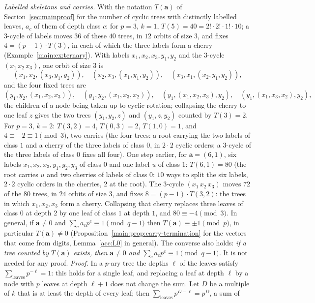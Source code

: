 \documentclass[11pt]{article}
\theoremstyle{definition}
\theoremstyle{remark}
\numberwithin{equation}{section}
\numberwithin{figure}{section}
\begin{document}
\emph{Labelled skeletons and carries.} With the notation $T(\mathbf a)$ of Section~\ref{sec:mainproof} for the
number of cyclic trees with distinctly labelled leaves, $a_c$ of them of depth class $c$: for $p=3$, $k=1$,
$T(5)=40=2!\cdot2!\cdot1!\cdot10$; a $3$-cycle of labels moves $36$ of these $40$ trees, in $12$ orbits of
size $3$, and fixes $4=(p-1)\cdot T(3)$, in each of which the three labels form a cherry
(Example~\ref{main:ex:ternary}).
With labels $x_1,x_2,x_3,y_1,y_2$ and the $3$-cycle $(x_1\,x_2\,x_3)$, one orbit of size $3$ is
\[
 (x_1,x_2,(x_3,y_1,y_2)),\quad(x_2,x_3,(x_1,y_1,y_2)),\quad(x_3,x_1,(x_2,y_1,y_2)),
\]
and the four fixed trees are
\[
 (y_1,y_2,(x_1,x_2,x_3)),\quad(y_1,y_2,(x_1,x_3,x_2)),\quad(y_1,(x_1,x_2,x_3),y_2),\quad(y_1,(x_1,x_3,x_2),y_2),
\]
the children of a node being taken up to cyclic rotation; collapsing the cherry to one leaf $z$ gives the two
trees $(y_1,y_2,z)$ and $(y_1,z,y_2)$ counted by $T(3)=2$. For $p=3$, $k=2$: $T(3,2)=4$, $T(0,3)=2$, $T(1,0)=1$, and
$4\equiv-2\equiv1\pmod3$, two carries (the four trees: a root carrying the two labels of class $1$ and a
cherry of the three labels of class $0$, in $2\cdot2$ cyclic orders; a $3$-cycle of the three labels of
class $0$ fixes all four). One step earlier, for $\mathbf a=(6,1)$, six labels $x_1,x_2,x_3,y_1,y_2,y_3$ of
class $0$ and one label $u$ of class $1$: $T(6,1)=80$ (the root carries $u$ and two cherries of labels of
class $0$: $10$ ways to split the six labels, $2\cdot2$ cyclic orders in the cherries, $2$ at the root). The
$3$-cycle $(x_1\,x_2\,x_3)$ moves $72$ of the $80$ trees, in $24$ orbits of size $3$, and fixes
$8=(p-1)\cdot T(3,2)$: the trees in which $x_1,x_2,x_3$ form a cherry. Collapsing that cherry replaces three
leaves of class $0$ at depth $2$ by one leaf of class $1$ at depth $1$, and $80\equiv-4\pmod3$. In general, if $\mathbf a\ne0$ and
$\sum_ca_cp^c\equiv1\pmod{q-1}$ then $T(\mathbf a)\equiv\pm1\pmod p$, in particular $T(\mathbf a)\ne0$
(Proposition~\ref{main:prop:carry-termination} for the vectors that come from digits, Lemma~\ref{acc:L0} in
general). The converse also holds: \emph{if a tree counted by $T(\mathbf a)$ exists, then $\mathbf a\ne0$ and
$\sum_ca_cp^c\equiv1\pmod{q-1}$.} It is not needed for any proof. \emph{Proof.} In a $p$-ary tree the depths
$\ell$ of the leaves satisfy $\sum_{\text{leaves}}p^{-\ell}=1$: this holds for a single leaf, and replacing a
leaf at depth $\ell$ by a node with $p$ leaves at depth $\ell+1$ does not change the sum. Let $D$ be a multiple
of $k$ that is at least the depth of every leaf; then $\sum_{\text{leaves}}p^{D-\ell}=p^{D}$, a sum of
\end{document}
